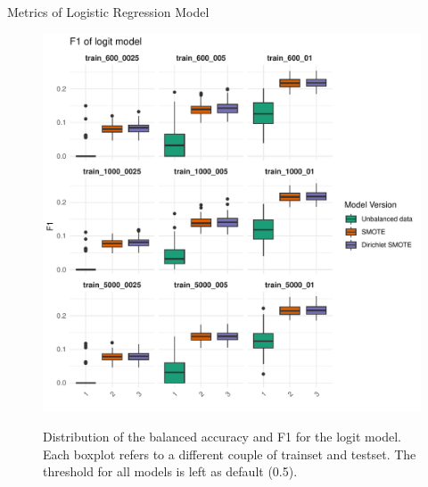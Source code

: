\documentclass{beamer}
\begin{document}
\begin{frame}{Metrics of Logistic Regression Model}
\begin{figure}
\begin{minipage}{0.42\textwidth}
      \includegraphics[width=\linewidth]{images/Logit_f1_default_threshold.pdf}
      \label{fig:label7}
    \end{minipage}
    \caption{Distribution of the balanced accuracy and F1 for the logit model. Each boxplot refers to a different couple of trainset and testset. The threshold for all models is left as default (0.5).}
  \end{figure}
\end{frame}
\end{document}
